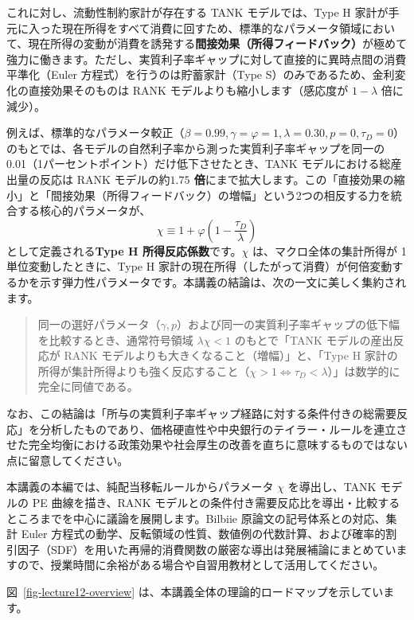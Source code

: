 \documentclass[
  japanese,
  lualatex,
  ja=standard,
  12pt,
  a4paper]{ltjsarticle}
\begin{document}
これに対し、流動性制約家計が存在する TANK モデルでは、Type H
家計が手元に入った現在所得をすべて消費に回すため、標準的なパラメータ領域において、現在所得の変動が消費を誘発する\textbf{間接効果（所得フィードバック）}が極めて強力に働きます。ただし、実質利子率ギャップに対して直接的に異時点間の消費平準化（Euler
方程式）を行うのは貯蓄家計（Type
S）のみであるため、金利変化の直接効果そのものは RANK
モデルよりも縮小します（感応度が \(1-\lambda\) 倍に減少）。


例えば、標準的なパラメータ較正（\(\beta=0.99, \gamma=\varphi=1, \lambda=0.30, p=0, \tau_D=0\)）のもとでは、各モデルの自然利子率から測った実質利子率ギャップを同一の
0.01（1パーセントポイント）だけ低下させたとき、TANK
モデルにおける総産出量の反応は RANK モデルの約\textbf{\(1.75\)
倍}にまで拡大します。この「直接効果の縮小」と「間接効果（所得フィードバック）の増幅」という2つの相反する力を統合する核心的パラメータが、
\[
\chi \equiv 1 + \varphi\left( 1 - \frac{\tau_D}{\lambda} \right)
\] として定義される\textbf{Type H 所得反応係数}です。\(\chi\)
は、マクロ全体の集計所得が 1 単位変動したときに、Type H
家計の現在所得（したがって消費）が何倍変動するかを示す弾力性パラメータです。本講義の結論は、次の一文に美しく集約されます。

\begin{quote}
同一の選好パラメータ（\(\gamma, p\)）および同一の実質利子率ギャップの低下幅を比較するとき、通常符号領域
\(\lambda\chi<1\) のもとで「TANK モデルの産出反応が RANK
モデルよりも大きくなること（増幅）」と、「Type H
家計の所得が集計所得よりも強く反応すること（\(\chi>1 \iff \tau_D < \lambda\)）」は数学的に完全に同値である。
\end{quote}

なお、この結論は「所与の実質利子率ギャップ経路に対する条件付きの総需要反応」を分析したものであり、価格硬直性や中央銀行のテイラー・ルールを連立させた完全均衡における政策効果や社会厚生の改善を直ちに意味するものではない点に留意してください。

本講義の本編では、純配当移転ルールからパラメータ \(\chi\) を導出し、TANK
モデルの PE 曲線を描き、RANK
モデルとの条件付き需要反応比を導出・比較するところまでを中心に議論を展開します。Bilbiie
原論文の記号体系との対応、集計 Euler
方程式の動学、反転領域の性質、数値例の代数計算、および確率的割引因子（SDF）を用いた再帰的消費関数の厳密な導出は発展補論にまとめていますので、授業時間に余裕がある場合や自習用教材として活用してください。

図~\ref{fig-lecture12-overview}
は、本講義全体の理論的ロードマップを示しています。
\end{document}
